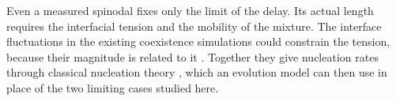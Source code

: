 Even a measured spinodal fixes only the limit of the delay. Its actual length requires the
interfacial tension and the mobility of the mixture. The interface fluctuations in the
existing coexistence simulations could constrain the tension, because their magnitude is
related to it \cite{gilmore2026}. Together
they give nucleation rates through classical nucleation theory \cite{kashchiev2000}, which an
evolution model can then use in place of the two limiting cases studied here.
